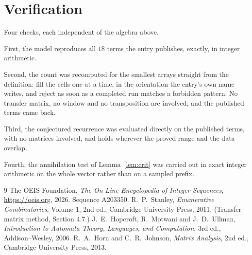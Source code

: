 \documentclass[11pt,a4paper]{article}
\theoremstyle{plain}
\theoremstyle{definition}
\begin{document}
\section{Verification}

Four checks, each independent of the algebra above.

First, the model reproduces all $18$ terms the entry publishes, exactly, in integer
arithmetic.

Second, the count was recomputed for the smallest arrays straight from the definition: fill the
cells one at a time, in the orientation the entry's own name writes, and reject as soon as a
completed run matches a forbidden pattern. No transfer matrix, no window and no transposition
are involved, and the published terms came back.

Third, the conjectured recurrence was evaluated directly on the published terms, with no
matrices involved, and holds wherever the proved range and the data overlap.

Fourth, the annihilation test of Lemma~\ref{lem:crit} was carried out in exact integer
arithmetic on the whole vector rather than on a sampled prefix.

\begin{thebibliography}{9}
 The OEIS Foundation, \emph{The On-Line Encyclopedia of Integer
Sequences}, \url{https://oeis.org}, 2026. Sequence A203350.
 R.~P.~Stanley, \emph{Enumerative Combinatorics}, Volume 1, 2nd ed.,
Cambridge University Press, 2011. (Transfer-matrix method, Section 4.7.)
 J.~E.~Hopcroft, R.~Motwani and J.~D.~Ullman, \emph{Introduction to Automata
Theory, Languages, and Computation}, 3rd ed., Addison--Wesley, 2006.
 R.~A.~Horn and C.~R.~Johnson, \emph{Matrix Analysis}, 2nd ed., Cambridge
University Press, 2013.
\end{thebibliography}
\end{document}
